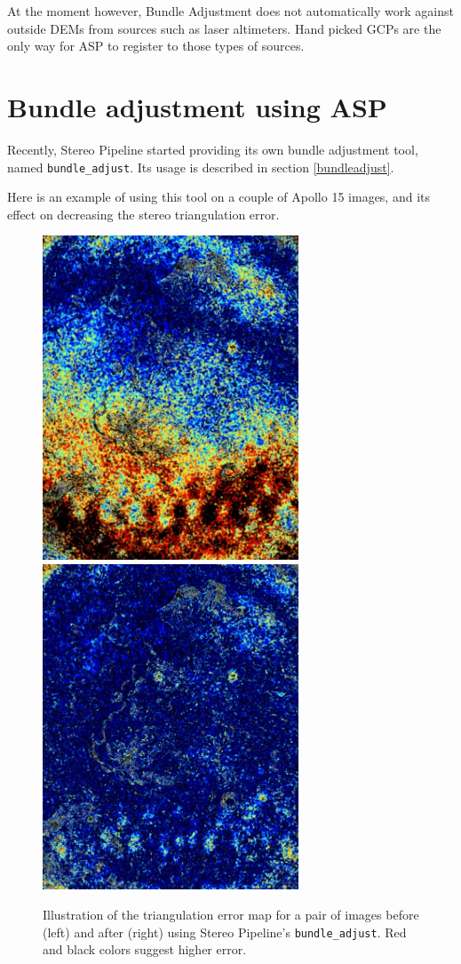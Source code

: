 At the moment however, Bundle Adjustment does not automatically work
against outside DEMs from sources such as laser altimeters. Hand
picked \acp{GCP} are the only way for \ac{ASP} to register to those
types of sources.

\section{Bundle adjustment using ASP}
\label{baasp}

Recently, Stereo Pipeline started providing its own bundle adjustment
tool, named \texttt{bundle\_adjust}. Its usage is described in section
\ref{bundleadjust}. 

Here is an example of using this tool on a couple of Apollo 15 images,
and its effect on decreasing the stereo triangulation error. 

\begin{figure}[h!]
\centering
  \includegraphics[width=3.0in]{images/examples/before_ba.jpg}
  \includegraphics[width=3.0in]{images/examples/after_ba.jpg}
\caption{Illustration of the triangulation error map for a pair of
  images before (left) and after (right) using Stereo Pipeline's
  \texttt{bundle\_adjust}. Red and black colors suggest higher error.}
\label{fig:asp-ba-example}
\end{figure}

